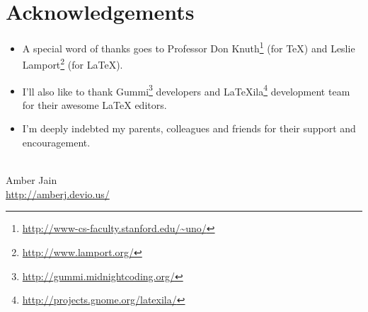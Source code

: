 \documentclass[../main.tex]{subfiles}
\begin{document}
 
\section*{Acknowledgements}
\begin{itemize}
\item A special word of thanks goes to Professor Don Knuth\footnote{\url{http://www-cs-faculty.stanford.edu/~uno/}} (for \TeX{}) and Leslie Lamport\footnote{\url{http://www.lamport.org/}} (for \LaTeX{}).
\item I'll also like to thank Gummi\footnote{\url{http://gummi.midnightcoding.org/}} developers and LaTeXila\footnote{\url{http://projects.gnome.org/latexila/}} development team for their awesome \LaTeX{} editors.
\item I'm deeply indebted my parents, colleagues and friends for their support and encouragement.
\end{itemize}
\mbox{}\\
\noindent Amber Jain \\
\noindent \url{http://amberj.devio.us/}
\end{document}
